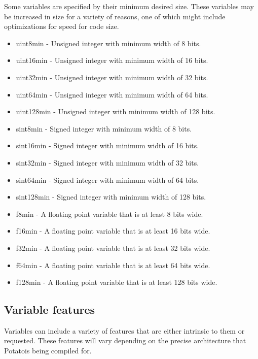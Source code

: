 \documentclass[12pt]{article}
\newcommand{\progLangNameSpace}{Potato\space }
\begin{document}
Some variables are specified by their minimum desired size. These variables may be increased in size for a variety of reasons, one of which might include optimizations for speed for code size.

\begin{itemize}
\item uint8min - Unsigned integer with minimum width of 8 bits.
\item uint16min - Unsigned integer with minimum width of 16 bits.
\item uint32min - Unsigned integer with minimum width of 32 bits.
\item uint64min - Unsigned integer with minimum width of 64 bits.
\item uint128min - Unsigned integer with minimum width of 128 bits.
\item sint8min - Signed integer with minimum width of 8 bits.
\item sint16min - Signed integer with minimum width of 16 bits.
\item sint32min - Signed integer with minimum width of 32 bits.
\item sint64min - Signed integer with minimum width of 64 bits.
\item sint128min - Signed integer with minimum width of 128 bits.
\item f8min - A floating point variable that is at least 8 bits wide.
\item f16min - A floating point variable that is at least 16 bits wide.
\item f32min - A floating point variable that is at least 32 bits wide.
\item f64min - A floating point variable that is at least 64 bits wide.
\item f128min - A floating point variable that is at least 128 bits wide.
\end{itemize}

\subsection{Variable features}

Variables can include a variety of features that are either intrinsic to them or requested. These features will vary depending on the precise architecture that \progLangNameSpace is being compiled for.
\end{document}
